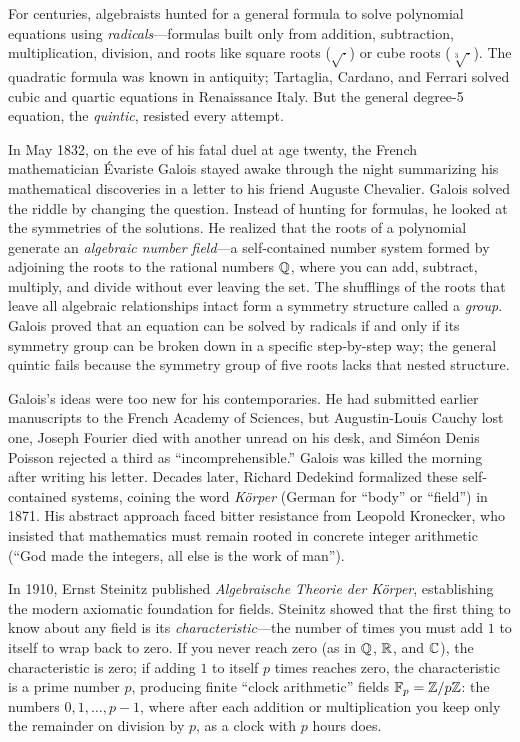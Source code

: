 \begin{historybox}
For centuries, algebraists hunted for a general formula to solve polynomial equations using
\emph{radicals}---formulas built only from addition, subtraction, multiplication, division,
and roots like square roots ($\sqrt{\cdot}$) or cube roots ($\sqrt[3]{\cdot}$). The quadratic
formula was known in antiquity; Tartaglia, Cardano, and Ferrari solved cubic and quartic
equations in Renaissance Italy. But the general degree-5 equation, the \emph{quintic},
resisted every attempt.

In May 1832, on the eve of his fatal duel at age twenty, the French mathematician \'Evariste
Galois stayed awake through the night summarizing his mathematical discoveries in
a letter to his friend Auguste Chevalier. Galois solved the riddle by changing the question.
Instead of hunting for formulas, he looked at the symmetries of the solutions. He realized
that the roots of a polynomial generate an \emph{algebraic number field}---a self-contained
number system formed by adjoining the roots to the rational numbers $\mathbb{Q}$, where you can add,
subtract, multiply, and divide without ever leaving the set. The shufflings of the roots
that leave all algebraic relationships intact form a symmetry structure called a \emph{group}.
Galois proved that an equation can be solved by radicals if and only if its symmetry group
can be broken down in a specific step-by-step way; the general quintic fails because the
symmetry group of five roots lacks that nested structure.

Galois's ideas were too new for his contemporaries. He had submitted earlier
manuscripts to the French Academy of Sciences, but Augustin-Louis Cauchy lost one, Joseph
Fourier died with another unread on his desk, and Sim\'eon Denis Poisson rejected a third
as ``incomprehensible.'' Galois was killed the morning after writing his letter. Decades later,
Richard Dedekind formalized these self-contained systems, coining the word \emph{K\"orper}
(German for ``body'' or ``field'') in 1871. His abstract approach faced bitter resistance
from Leopold Kronecker, who insisted that mathematics must remain rooted in concrete integer
arithmetic (``God made the integers, all else is the work of man'').

In 1910, Ernst Steinitz published \emph{Algebraische Theorie der K\"orper}, establishing
the modern axiomatic foundation for fields. Steinitz showed that the first thing to know
about any field is its \emph{characteristic}---the number of times you must add $1$ to itself to wrap back
to zero. If you never reach zero (as in $\mathbb{Q}$, $\mathbb{R}$, and $\mathbb{C}$), the characteristic is zero;
if adding $1$ to itself $p$ times reaches zero, the characteristic is a prime number $p$,
producing finite ``clock arithmetic'' fields $\mathbb{F}_p = \mathbb{Z}/p\mathbb{Z}$: the numbers
$0, 1, \dots, p-1$, where after each addition or multiplication you keep only the
remainder on division by $p$, as a clock with $p$ hours does.


\end{historybox}
